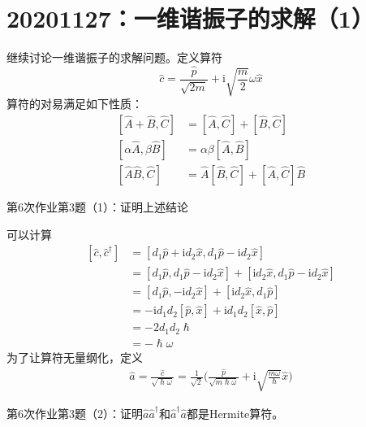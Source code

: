     \section{20201127：一维谐振子的求解（1）}
        继续讨论一维谐振子的求解问题。定义算符
        \[ \hat{c} = \frac {\hat{p}}{\sqrt{2m}} + \mathrm{i}\sqrt{\frac m2}\omega \hat{x} \]
        算符的对易满足如下性质：
        \begin{equation}\begin{aligned}
            [\hat{A}+\hat{B},\hat{C}] &= [\hat{A},\hat{C}]+[\hat{B},\hat{C}]\\
            [\alpha \hat{A}, \beta \hat{B}] &= \alpha \beta [\hat{A},\hat{B}]\\
            [\hat{A}\hat{B},\hat{C}] &= \hat{A}[\hat{B},\hat{C}] + [\hat{A},\hat{C}]\hat{B}
        \end{aligned}\end{equation}
        \begin{asg}
            第6次作业第3题（1）：证明上述结论
        \end{asg}
        可以计算
        \begin{equation}\begin{aligned}
            [\hat{c},\hat{c}^\dagger] &= [d_1\hat{p} +\mathrm{i}d_2\hat{x}, d_1\hat{p} - \mathrm{i}d_2\hat{x}]\\
            &= [d_1\hat{p}, d_1\hat{p} - \mathrm{i}d_2\hat{x}] + [\mathrm{i}d_2\hat{x}, d_1\hat{p} - \mathrm{i}d_2\hat{x}]\\
            &= [d_1\hat{p}, -\mathrm{i}d_2\hat{x}] + [\mathrm{i}d_2\hat{x}, d_1\hat{p}]\\
            &= -\mathrm{i}d_1d_2[\hat{p},\hat{x}] + \mathrm{i}d_1d_2[\hat{x},\hat{p}]\\
            &= -2d_1d_2\hslash\\
            &= -\hslash \omega
        \end{aligned}\end{equation}
        为了让算符无量纲化，定义
        \begin{equation}\begin{aligned}
            \hat{a} = \frac {\hat{c}}{\sqrt{\hslash \omega}} =\frac 1{\sqrt{2}} \bigg(\frac {\hat{p}}{\sqrt{m\hslash\omega}} + \mathrm{i}\sqrt{\frac {m\omega}{\hslash}} \hat{x}\bigg)
        \end{aligned}\end{equation}
        \begin{asg}
            第6次作业第3题（2）：证明$\hat{a}\hat{a}^\dagger$和$\hat{a}^\dagger\hat{a}$都是Hermite算符。
        \end{asg}
